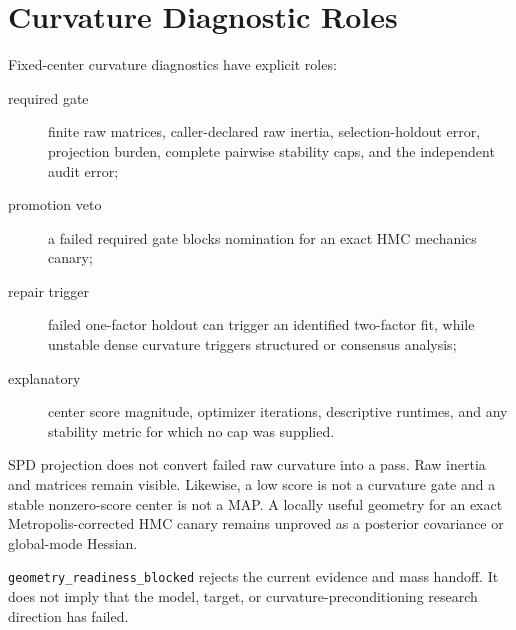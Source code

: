 \section{Curvature Diagnostic Roles}
\label{sec:bf-curvature-diagnostic-roles}

Fixed-center curvature diagnostics have explicit roles:
\begin{description}
  \item[required gate] finite raw matrices, caller-declared raw inertia,
    selection-holdout error, projection burden, complete pairwise stability
    caps, and the independent audit error;
  \item[promotion veto] a failed required gate blocks nomination for an exact
    HMC mechanics canary;
  \item[repair trigger] failed one-factor holdout can trigger an identified
    two-factor fit, while unstable dense curvature triggers structured or
    consensus analysis;
  \item[explanatory] center score magnitude, optimizer iterations, descriptive
    runtimes, and any stability metric for which no cap was supplied.
\end{description}

SPD projection does not convert failed raw curvature into a pass.  Raw inertia
and matrices remain visible.  Likewise, a low score is not a curvature gate and
a stable nonzero-score center is not a MAP.  A locally useful geometry for an
exact Metropolis-corrected HMC canary remains unproved as a posterior covariance
or global-mode Hessian.

\texttt{geometry\_readiness\_blocked} rejects the current evidence and mass
handoff.  It does not imply that the model, target, or curvature-preconditioning
research direction has failed.
